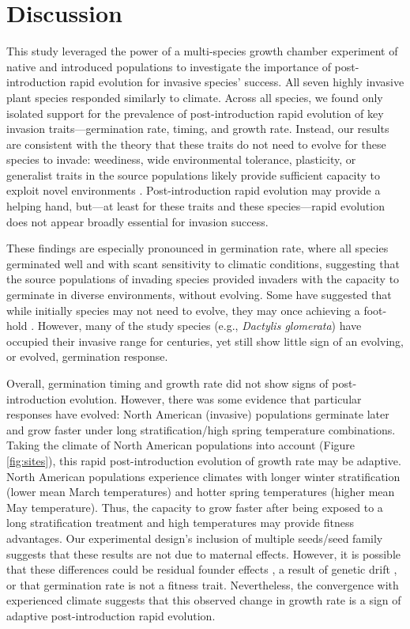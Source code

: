 \documentclass[12pt]{article}\usepackage[]{graphicx}\usepackage[]{color}
\begin{document}
	\section{Discussion}
	
	This study leveraged the power of a multi-species growth chamber experiment of native and introduced populations to investigate the importance of post-introduction rapid evolution for invasive species' success. All seven highly invasive plant species responded similarly to climate. Across all species, we found only isolated support for the prevalence of post-introduction rapid evolution of key invasion traits---germination rate, timing, and growth rate. Instead, our results are consistent with the theory that these traits do not need to evolve for these species to invade: weediness, wide environmental tolerance, plasticity, or generalist traits in the source populations likely provide sufficient capacity to exploit novel environments \parencite{Baker1965}. Post-introduction rapid evolution may provide a helping hand, but---at least for these traits and these species---rapid evolution does not appear broadly essential for invasion success. %
	
	These findings are especially pronounced in germination rate, where all species germinated well and with scant sensitivity to climatic conditions, suggesting that the source populations of invading species provided invaders with the capacity to germinate in diverse environments, without evolving. Some have suggested that while initially species may not need to evolve, they may once achieving a foot-hold \parencite{Lamarque2015}. However, many of the study species (e.g., \textit{Dactylis glomerata}) have occupied their invasive range for centuries, yet still show little sign of an evolving, or evolved, germination response. 
	
	Overall, germination timing and growth rate did not show signs of post-introduction evolution. However, there was some evidence that particular responses have evolved: North American (invasive) populations germinate later and grow faster under long stratification/high spring temperature combinations. Taking the climate of North American populations into account (Figure \ref{fig:sites}), this rapid post-introduction evolution of growth rate may be adaptive. North American populations experience climates with longer winter stratification  (lower mean March temperatures) and hotter spring temperatures (higher mean May temperature). Thus, the capacity to grow faster after being exposed to a long stratification treatment and high temperatures may provide fitness advantages. Our experimental design's inclusion of multiple seeds/seed family suggests that these results are not due to maternal effects. However, it is  possible that these differences could be residual founder effects \parencite{Shirk2014}, a result of genetic drift \parencite{Eckert1996}, or that germination rate is not a fitness trait. Nevertheless, the convergence with experienced climate suggests that this observed change in growth rate is a sign of adaptive post-introduction rapid evolution. 
	
\end{document}
